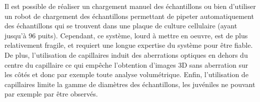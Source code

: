 \documentclass[\main/main.tex]{subfiles}
\begin{document}
%
Il est possible de réaliser un chargement manuel des échantillons ou bien d'utiliser un robot de chargement des échantillons permettant de pipeter automatiquement des échantillons qui se trouvent dans une plaque de culture cellulaire (ayant jusqu'à 96 puits).
%
Cependant, ce système, lourd à mettre en oeuvre, est de plus relativement fragile, et requiert une longue expertise du système pour être fiable.
De plus, l'utilisation de capillaires induit des aberrations optiques en dehors du centre du capillaire ce qui empêche l'obtention d'images 3D sans aberration sur les côtés et donc par exemple toute analyse volumétrique. Enfin, l'utilisation de capillaires limite la gamme de diamètres des échantillons, les juvéniles ne pouvant par exemple par être observés.
\end{document}
